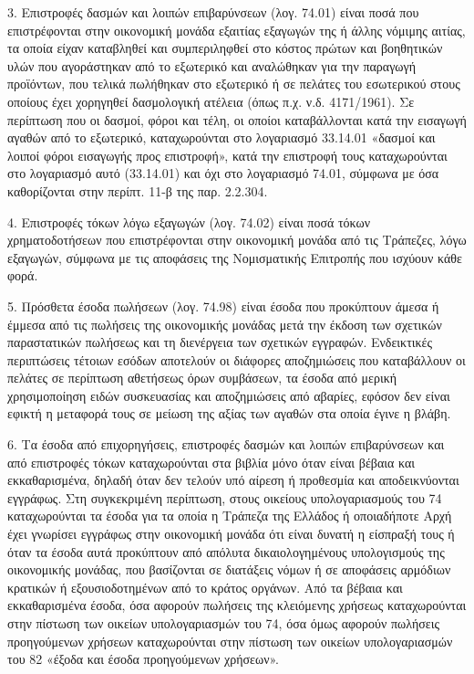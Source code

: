 \documentclass[A4,10pt,greek]{book}
\begin{document}
3. Επιστροφές δασμών και λοιπών επιβαρύνσεων (λογ. 74.01) είναι ποσά που επιστρέφονται στην οικονομική μονάδα εξαιτίας εξαγωγών της ή άλλης νόμιμης αιτίας, τα οποία είχαν καταβληθεί και συμπεριληφθεί στο κόστος πρώτων και βοηθητικών υλών που αγοράστηκαν από το εξωτερικό και αναλώθηκαν για την παραγωγή προϊόντων, που τελικά πωλήθηκαν στο εξωτερικό ή σε πελάτες του εσωτερικού στους οποίους έχει χορηγηθεί δασμολογική ατέλεια (όπως π.χ. ν.δ. 4171/1961). Σε περίπτωση που οι δασμοί, φόροι και τέλη, οι οποίοι καταβάλλονται κατά την εισαγωγή αγαθών από το εξωτερικό, καταχωρούνται στο λογαριασμό 33.14.01 «δασμοί και λοιποί φόροι εισαγωγής προς επιστροφή», κατά την επιστροφή τους καταχωρούνται στο λογαριασμό αυτό (33.14.01) και όχι στο λογαριασμό 74.01, σύμφωνα με όσα καθορίζονται στην περίπτ. 11-β της παρ. 2.2.304.

4. Επιστροφές τόκων λόγω εξαγωγών (λογ. 74.02) είναι ποσά τόκων χρηματοδοτήσεων που επιστρέφονται στην οικονομική μονάδα από τις Τράπεζες, λόγω εξαγωγών, σύμφωνα με τις αποφάσεις της Νομισματικής Επιτροπής που ισχύουν κάθε φορά.

5. Πρόσθετα έσοδα πωλήσεων (λογ. 74.98) είναι έσοδα που προκύπτουν άμεσα ή έμμεσα από τις πωλήσεις της οικονομικής μονάδας μετά την έκδοση των σχετικών παραστατικών πωλήσεως και τη διενέργεια των σχετικών εγγραφών. Ενδεικτικές περιπτώσεις τέτοιων εσόδων αποτελούν οι διάφορες αποζημιώσεις που καταβάλλουν οι πελάτες σε περίπτωση αθετήσεως όρων συμβάσεων, τα έσοδα από μερική χρησιμοποίηση ειδών συσκευασίας και αποζημιώσεις από αβαρίες, εφόσον δεν είναι εφικτή η μεταφορά τους σε μείωση της αξίας των αγαθών στα οποία έγινε η βλάβη.

6. Τα έσοδα από επιχορηγήσεις, επιστροφές δασμών και λοιπών επιβαρύνσεων και από επιστροφές τόκων καταχωρούνται στα βιβλία μόνο όταν είναι βέβαια και εκκαθαρισμένα, δηλαδή όταν δεν τελούν υπό αίρεση ή προθεσμία και αποδεικνύονται εγγράφως. Στη συγκεκριμένη περίπτωση, στους οικείους υπολογαριασμούς του 74 καταχωρούνται τα έσοδα για τα οποία η Τράπεζα της Ελλάδος ή οποιαδήποτε Αρχή έχει γνωρίσει εγγράφως στην οικονομική μονάδα ότι είναι δυνατή η είσπραξή τους ή όταν τα έσοδα αυτά προκύπτουν από απόλυτα δικαιολογημένους υπολογισμούς της οικονομικής μονάδας, που βασίζονται σε διατάξεις νόμων ή σε αποφάσεις αρμόδιων κρατικών ή εξουσιοδοτημένων από το κράτος οργάνων. Από τα βέβαια και εκκαθαρισμένα έσοδα, όσα αφορούν πωλήσεις της κλειόμενης χρήσεως καταχωρούνται στην πίστωση των οικείων υπολογαριασμών του 74, όσα όμως αφορούν πωλήσεις προηγούμενων χρήσεων καταχωρούνται στην πίστωση των οικείων υπολογαριασμών του 82 «έξοδα και έσοδα προηγούμενων χρήσεων».
\end{document}

